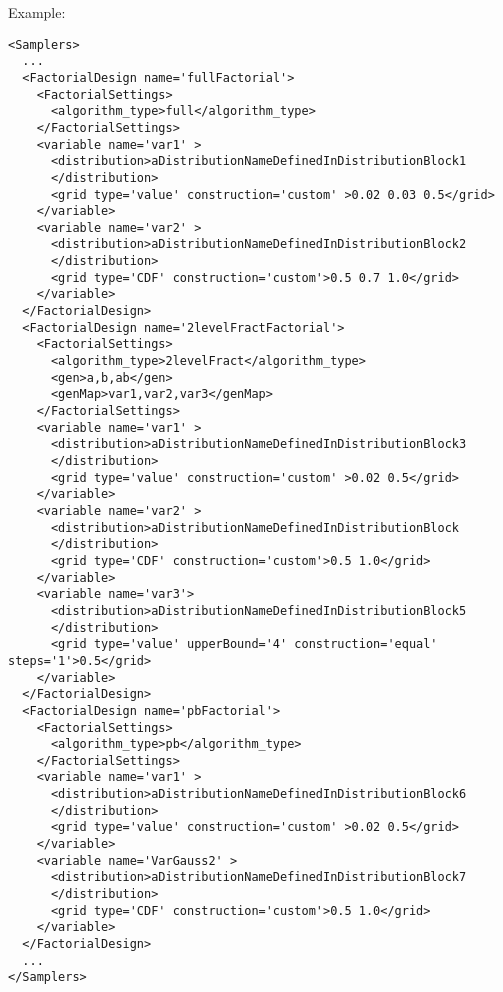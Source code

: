 Example:
\begin{lstlisting}[style=XML,morekeywords={construction,upperBound,steps}]
<Samplers>
  ...
  <FactorialDesign name='fullFactorial'>
    <FactorialSettings>
      <algorithm_type>full</algorithm_type>
    </FactorialSettings>
    <variable name='var1' >
      <distribution>aDistributionNameDefinedInDistributionBlock1
      </distribution>
      <grid type='value' construction='custom' >0.02 0.03 0.5</grid>
    </variable>
    <variable name='var2' >
      <distribution>aDistributionNameDefinedInDistributionBlock2
      </distribution>
      <grid type='CDF' construction='custom'>0.5 0.7 1.0</grid>
    </variable>
  </FactorialDesign>
  <FactorialDesign name='2levelFractFactorial'>
    <FactorialSettings>
      <algorithm_type>2levelFract</algorithm_type>
      <gen>a,b,ab</gen>
      <genMap>var1,var2,var3</genMap>
    </FactorialSettings>
    <variable name='var1' >
      <distribution>aDistributionNameDefinedInDistributionBlock3
      </distribution>
      <grid type='value' construction='custom' >0.02 0.5</grid>
    </variable>
    <variable name='var2' >
      <distribution>aDistributionNameDefinedInDistributionBlock
      </distribution>
      <grid type='CDF' construction='custom'>0.5 1.0</grid>
    </variable>
    <variable name='var3'>
      <distribution>aDistributionNameDefinedInDistributionBlock5
      </distribution>
      <grid type='value' upperBound='4' construction='equal' steps='1'>0.5</grid>
    </variable>
  </FactorialDesign>
  <FactorialDesign name='pbFactorial'>
    <FactorialSettings>
      <algorithm_type>pb</algorithm_type>
    </FactorialSettings>
    <variable name='var1' >
      <distribution>aDistributionNameDefinedInDistributionBlock6
      </distribution>
      <grid type='value' construction='custom' >0.02 0.5</grid>
    </variable>
    <variable name='VarGauss2' >
      <distribution>aDistributionNameDefinedInDistributionBlock7
      </distribution>
      <grid type='CDF' construction='custom'>0.5 1.0</grid>
    </variable>
  </FactorialDesign>
  ...
</Samplers>
\end{lstlisting}

